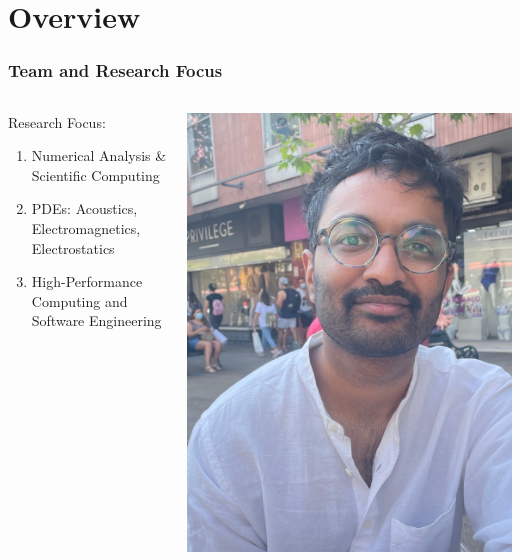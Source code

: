 \section{Overview}

\begin{frame}
    \frametitle{Team and Research Focus}
    \begin{columns}

        \begin{column}{0.5\textwidth}

        Research Focus:

            \begin{enumerate}
                \item Numerical Analysis \& Scientific Computing
                \item PDEs: Acoustics, Electromagnetics, Electrostatics
                \item High-Performance Computing and Software Engineering
            \end{enumerate}
        \end{column}
        \begin{column}{0.5\textwidth}
             \begin{center}
                 \begin{minipage}{0.48\linewidth}
                    \includegraphics[width=0.9\linewidth]{assets/sri.jpeg}

\end{minipage}
\end{center}
\end{column}
\end{columns}
\end{frame}

